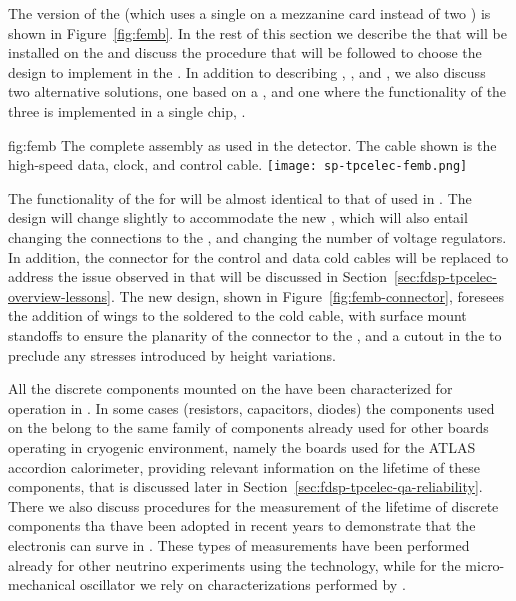 The  version of the  (which uses a single 
 on a mezzanine card instead of two  
) is shown in Figure~\ref{fig:femb}. In the rest of
this section we describe the  that will be installed
on the  and discuss the procedure that will be 
followed to choose the  design %
to implement in the %
. %
In addition to
describing , , and ,
we also discuss two alternative solutions, one based on a 
 , and one where the functionality of the
three  is implemented in a single chip, .

\begin{dunefigure}
{fig:femb}
{The complete  assembly as used in the  
detector. The cable shown is the high-speed data, clock, and control cable.}
\texttt{[image: sp-tpcelec-femb.png]}
\end{dunefigure}

The functionality of the  for  will be
almost identical to that of  used in .
The design will change slightly to accommodate the new ,
which will also entail changing the connections to the ,
and changing the number of voltage regulators. In addition, the
connector for the control and data cold cables will be replaced
to address the issue observed in  that will be discussed
in Section~\ref{sec:fdsp-tpcelec-overview-lessons}. The new design,
shown in Figure~\ref{fig:femb-connector}, foresees the addition
of wings to the  soldered to the cold cable, with 
surface mount standoffs to ensure the planarity of the connector
to the , and a cutout in the  to preclude %
any stresses introduced by height variations.

All the discrete components mounted on the  have been
characterized for operation in . In some cases (resistors,
capacitors, diodes) the components used on the  
belong to the same family of components already used for other boards
operating in cryogenic environment, namely the boards used for the 
ATLAS accordion  calorimeter, providing relevant information
on the lifetime of these components, that is discussed later in 
Section~\ref{sec:fdsp-tpcelec-qa-reliability}. There we also discuss
procedures for the measurement of the lifetime of discrete
components tha thave been adopted in recent years to demonstrate
that the  electronis can surve in . 
These types of measurements have been performed already for 
other neutrino experiments using the  
technology, while for the micro-mechanical oscillator we 
rely on characterizations performed by .

